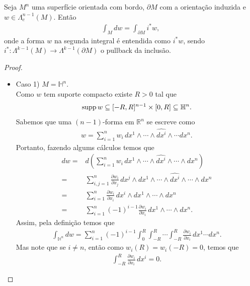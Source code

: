\begin{theorem}
  Seja $M^{n}$ uma superfície orientada com bordo, $\partial M$ com a orientação induzida e $w\in\Lambda^{n-1}_c(M)$. Então
  \begin{align*}
    \int_{M}dw=\int_{\partial M}i^{\ast}w,
  \end{align*}
  onde a forma $w$ na segunda integral é entendida como $i^{\ast}w$, sendo $i^{\ast}:\Lambda^{k-1}(M)\to\Lambda^{k-1}(\partial M)$ o pullback da inclusão.
\end{theorem}
\begin{proof} 
  \begin{itemize}
    \item Caso 1) $M=\mathbb{H}^{n}$.\\
      Como $w$ tem suporte compacto existe $R>0$ tal que
      \begin{align*}
        \operatorname{supp} w\subseteq [-R,R]^{n-1}\times[0,R]\subseteq\mathbb{H}^{n}.
      \end{align*}
      Sabemos que uma $(n-1)$-forma em $\mathbb{R}^{n}$ se escreve como
      \begin{align*}
        w=\sum_{i=1}^{n}w_i\,dx^1\wedge\cdots\wedge\hat{dx^i}\wedge\cdots dx^{n}.
      \end{align*}
      Portanto, fazendo algums cálculos temos que
      \begin{align*}
        dw=&d\left( \sum_{i=1}^{n}w_i\,dx^1\wedge\cdots\wedge\hat{dx^i}\wedge\cdots\wedge dx^{n}\right)\\
        =&\sum_{i,j=1}^{n}\frac{\partial w_i}{\partial x_j}\,dx^{j}\wedge dx^1\wedge\cdots\wedge\hat{dx^i}\wedge\cdots\wedge dx^{n}\\
        =&\sum_{i=1}^{n}\frac{\partial w_i}{\partial x_i}\,dx^{i}\wedge dx^1\wedge\cdots\wedge dx^{n}\\
        =&\sum_{i=1}^{n}(-1)^{i-1}\frac{\partial w_i}{\partial x_i}\,dx^{1}\wedge\cdots\wedge dx^{n}. 
      \end{align*}
      Assim, pela definição temos que
      \begin{align*}
        \int_{\mathbb{H}^{n}}dw=\sum_{i=1}^{n}(-1)^{i-1}\int_{0}^{R}\int_{-R}^{R}\cdots\int_{-R}^{R}\frac{\partial w_i}{\partial x_i}\,dx^{1}\cdots dx^{n}.
      \end{align*}
      Mas note que se $i\neq n$, então como $w_i(R)=w_i(-R)=0$, temos que
      \begin{align*}
        \int_{-R}^{R}\frac{\partial w_i}{\partial x_i}\,dx^{i}=0.
      \end{align*}

\end{itemize}
\end{proof}
